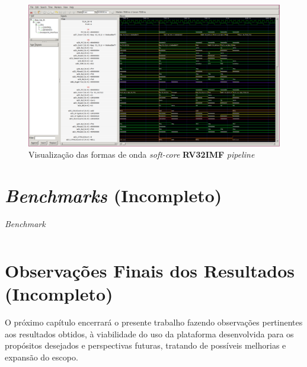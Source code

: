     \begin{figure}[H]
    \centering
        \includegraphics[width=0.9\linewidth]{../images/gtkwave/gtkwave_pipe.png}
        \caption{Visualização das formas de onda \textit{soft-core} \textbf{RV32IMF} \textit{pipeline}}
        \label{fig:gtkwave_pipe}
    \end{figure}

\section{\textit{Benchmarks} (Incompleto)}
    {
    }
    \begin{longtable}{|l|}
        \caption{\textit{Benchmark}}\label{table:benchmark}\\
        \hline
        \hline
        \endfirsthead
        \hline
        \hline
        \endhead
        \hline
    \end{longtable}

\section{Observações Finais dos Resultados (Incompleto)}

    { O próximo capítulo encerrará o presente trabalho fazendo observações
        pertinentes aos resultados obtidos, à viabilidade do uso da plataforma
        desenvolvida para os propósitos desejados e perspectivas futuras,
        tratando de possíveis melhorias e expansão do escopo.
    }

